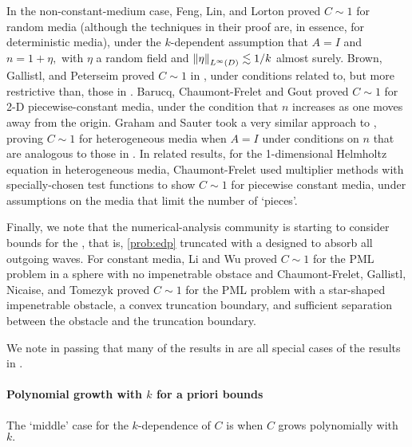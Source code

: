 In the non-constant-medium case, Feng, Lin, and Lorton \cite{FeLiLo:15} proved $C \sim 1$ for random media (although the techniques in their proof are, in essence, for deterministic media), under the $k$-dependent assumption that $A=I$ and $n = 1 + \eta,$ with $\eta$ a random field and $\NLiD{\eta} \lesssim 1/k$ almost surely. Brown, Gallistl, and Peterseim proved $C \sim 1$ in \cite{BrGaPe:17}, under conditions related to, but more restrictive than, those in \cite{GrPeSp:19}. Barucq, Chaumont-Frelet and Gout \cite{BaChGo:17} proved $C \sim 1$ for 2-D piecewise-constant media, under the condition that $n$ increases as one moves away from the origin.  Graham and Sauter \cite{GrSa:18} took a very similar approach to \cite{GrPeSp:19}, proving $C \sim 1$ for heterogeneous media when $A=I$ under conditions on $n$ that are analogous to those in \cite{GrPeSp:19}. In related results, for the 1-dimensional Helmholtz equation in heterogeneous media, Chaumont-Frelet \cite[Section 2.1.5, Theorem 3]{Ch:15} used multiplier methods with specially-chosen test functions to show $C \sim 1$ for piecewise constant media, under assumptions on the media that limit the number of `pieces'.

Finally, we note that the numerical-analysis community is starting to consider bounds for the , that is, \cref{prob:edp} truncated with a  designed to absorb all outgoing waves. For constant media, Li and Wu \cite{LiWu:18} proved $C \sim 1$ for the PML problem in a sphere with no impenetrable obstace and Chaumont-Frelet, Gallistl, Nicaise, and Tomezyk proved $C \sim 1$ for the PML problem with a star-shaped impenetrable obstacle, a convex truncation boundary, and sufficient separation between the obstacle and the truncation boundary.

We note in passing that many of the results in \cite{Mo:61,MoLu:68,Me:95,CuFe:06,BrGaPe:17,BaChGo:17,GrSa:18,MoSp:19} are all special cases of the results in \cite{GrPeSp:19}.


\paragraph{Polynomial growth with $k$ for a priori bounds} The `middle' case for the $k$-dependence of $C$ is when $C$ grows polynomially with $k.$

